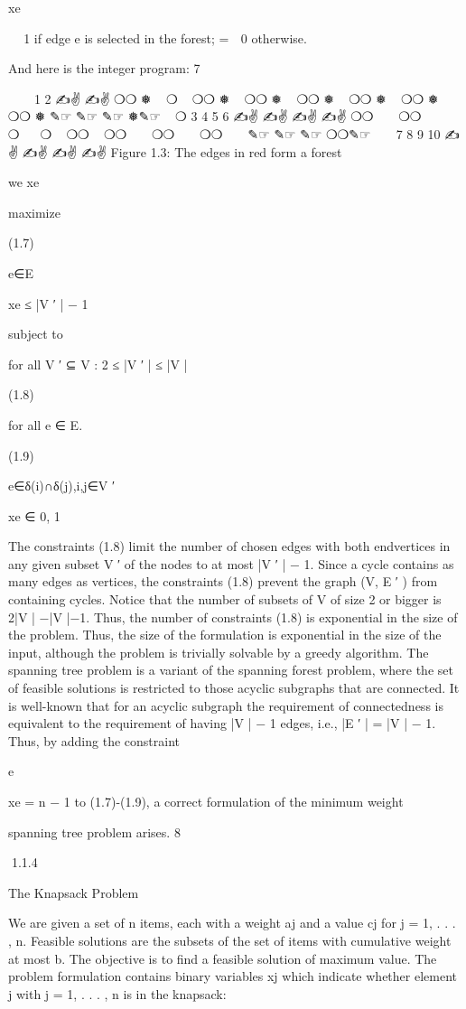 \documentclass[titlepage]{book}
\begin{document}
xe


 1 if edge e is selected in the forest;
=
 0 otherwise.

And here is the integer program:
7

✎☞
✎☞
1
2
✍✌
✍✌
❍❍
❅
 
❍
 
❍❍
❅
 
❍❍
❅
 
❍❍
❅
 
❍❍ ❅
 
❍❍ ❅
 
❍❍
❅
✎☞
✎☞
✎☞
❅✎☞
 
❍
3
4
5
6
✍✌
✍✌
✍✌
✍✌
❍❍
 
 
❍❍
 
 
❍ 
 
❍
  ❍❍
 
❍❍
 
 
❍❍
 
 
❍❍
 
 
✎☞
✎☞
✎☞
❍❍✎☞
 
 
7
8
9
10
✍✌
✍✌
✍✌
✍✌
Figure 1.3: The edges in red form a forest

we xe

maximize

(1.7)

e∈E

xe ≤ |V ′ | − 1

subject to

for all V ′ ⊆ V : 2 ≤ |V ′ | ≤ |V |

(1.8)

for all e ∈ E.

(1.9)

e∈δ(i)∩δ(j),i,j∈V ′

xe ∈ {0, 1}

The constraints (1.8) limit the number of chosen edges with both endvertices in any given subset V ′ of
the nodes to at most |V ′ | − 1. Since a cycle contains as many edges as vertices, the constraints (1.8)
prevent the graph (V, E ′ ) from containing cycles.
Notice that the number of subsets of V of size 2 or bigger is 2|V | −|V |−1. Thus, the number of constraints
(1.8) is exponential in the size of the problem. Thus, the size of the formulation is exponential in the size
of the input, although the problem is trivially solvable by a greedy algorithm.
The spanning tree problem is a variant of the spanning forest problem, where the set of feasible solutions is
restricted to those acyclic subgraphs that are connected. It is well-known that for an acyclic subgraph the
requirement of connectedness is equivalent to the requirement of having |V | − 1 edges, i.e., |E ′ | = |V | − 1.
Thus, by adding the constraint

e

xe = n − 1 to (1.7)-(1.9), a correct formulation of the minimum weight

spanning tree problem arises.
8

1.1.4

The Knapsack Problem

We are given a set of n items, each with a weight aj and a value cj for j = 1, . . . , n. Feasible solutions
are the subsets of the set of items with cumulative weight at most b. The objective is to find a feasible
solution of maximum value. The problem formulation contains binary variables xj which indicate whether
element j with j = 1, . . . , n is in the knapsack:
\end{document}
